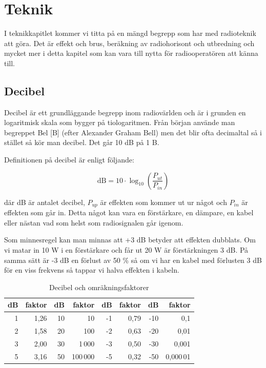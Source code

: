
\chapter{Teknik}

I teknikkapitlet kommer vi titta på en mängd begrepp som har med radioteknik
att göra. Det är effekt och brus, beräkning av radiohorisont och utbredning
och mycket mer i detta kapitel som kan vara till nytta för radiooperatören att
känna till.

\clearpage

\section{Decibel}

Decibel är ett grundläggande begrepp inom radiovärlden och är i grunden en
logaritmisk skala som bygger på tiologaritmen. Från början använde man
begreppet Bel [B] (efter Alexander Graham Bell) men det blir ofta decimaltal
så i stället så kör man decibel. Det går 10 dB på 1 B.

Definitionen på decibel är enligt följande:

\begin{equation}
  \text{dB} = 10 \cdot \log_{10} \left( \frac{P_{ut}}{P_{in}} \right)
\end{equation}

där dB är antalet decibel, $P_{up}$ är effekten som kommer ut ur något och
$P_{in}$ är effekten som går in. Detta något kan vara en förstärkare, en
dämpare, en kabel eller nästan vad som helst som radiosignalen går igenom.

Som minnesregel kan man minnas att +3 dB betyder att effekten dubblats. Om vi
matar in 10 W i en förstärkare och får ut 20 W är förstärkningen 3 dB. På
samma sätt är -3 dB en förlust av 50 \% så om vi har en kabel med förlusten 3
dB för en viss frekvens så tappar vi halva effekten i kabeln.

\begin{table}[h]
\centering
\begin{tabular}{rr|rr|rr|rr}
	\bf dB & \bf faktor & \bf dB & \bf faktor & \bf dB & \bf faktor & \bf dB & \bf faktor \\ \hline
	     1 &       1,26 &     10 &         10 &     -1 &       0,79 &    -10 &        0,1 \\
	     2 &       1,58 &     20 &        100 &     -2 &       0,63 &    -20 &       0,01 \\
	     3 &       2,00 &     30 &     1\,000 &     -3 &       0,50 &    -30 &      0,001 \\
	     5 &       3,16 &     50 &   100\,000 &     -5 &       0,32 &    -50 &  0,000\,01
\end{tabular}
\caption{Decibel och omräkningsfaktorer}
\end{table}

